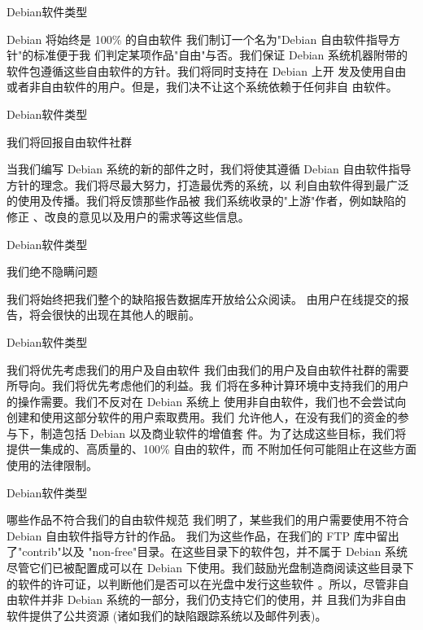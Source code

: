 \documentclass{beamer}
\begin{document}
\begin{frame}[t]{Debian软件类型}
	\begin{block}{Debian 将始终是 100\% 的自由软件}
    我们制订一个名为"Debian 自由软件指导方针"的标准便于我 们判定某项作品"自由"与否。我们保证 Debian 系统机器附带的软件包遵循这些自由软件的方针。我们将同时支持在 Debian 上开 发及使用自由或者非自由软件的用户。但是，我们决不让这个系统依赖于任何非自 由软件。
	\end{block}
	
\end{frame}
\begin{frame}[t]{Debian软件类型}
	\begin{block}{我们将回报自由软件社群}

    当我们编写 Debian 系统的新的部件之时，我们将使其遵循 Debian 自由软件指导 方针的理念。我们将尽最大努力，打造最优秀的系统，以 利自由软件得到最广泛的使用及传播。我们将反馈那些作品被 我们系统收录的"上游"作者，例如缺陷的修正 、改良的意见以及用户的需求等这些信息。
	\end{block}
	
\end{frame}
\begin{frame}[t]{Debian软件类型}
	\begin{block}{我们绝不隐瞒问题}

    我们将始终把我们整个的缺陷报告数据库开放给公众阅读。 由用户在线提交的报告，将会很快的出现在其他人的眼前。
	\end{block}
	
\end{frame}
\begin{frame}[t]{Debian软件类型}
	\begin{block}{我们将优先考虑我们的用户及自由软件}
    我们由我们的用户及自由软件社群的需要所导向。我们将优先考虑他们的利益。我 们将在多种计算环境中支持我们的用户的操作需要。我们不反对在 Debian 系统上 使用非自由软件，我们也不会尝试向创建和使用这部分软件的用户索取费用。我们 允许他人，在没有我们的资金的参与下，制造包括 Debian 以及商业软件的增值套 件。为了达成这些目标，我们将提供一集成的、高质量的、100\% 自由的软件，而 不附加任何可能阻止在这些方面使用的法律限制。
	\end{block}
	
\end{frame}
\begin{frame}[t]{Debian软件类型}
	\begin{block}{哪些作品不符合我们的自由软件规范}
    我们明了，某些我们的用户需要使用不符合 Debian 自由软件指导方针的作品。 我们为这些作品，在我们的 FTP 库中留出了"contrib"以及 "non-free"目录。在这些目录下的软件包，并不属于 Debian 系统 尽管它们已被配置成可以在 Debian 下使用。我们鼓励光盘制造商阅读这些目录下 的软件的许可证，以判断他们是否可以在光盘中发行这些软件 。所以，尽管非自由软件并非 Debian 系统的一部分，我们仍支持它们的使用，并 且我们为非自由软件提供了公共资源 (诸如我们的缺陷跟踪系统以及邮件列表)。
	\end{block}
\end{frame}
\end{document}
